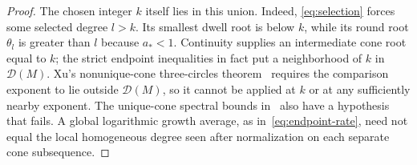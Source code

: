 \begin{proof}
The chosen integer $k$ itself lies in this union. Indeed,
\eqref{eq:selection} forces some selected degree $l>k$. Its smallest dwell
root is below $k$, while its round root $\theta_l$ is greater than $l$
because $a_*<1$. Continuity supplies an intermediate cone root equal to
$k$; the strict endpoint inequalities in fact put a neighborhood of $k$
in $\mathcal D(M)$. Xu's nonunique-cone three-circles
theorem~\cite[Theorem~3.4]{Xu} requires the comparison exponent to lie
outside $\mathcal D(M)$, so it cannot be applied at $k$ or at any
sufficiently nearby exponent. The unique-cone spectral bounds in~\cite{Huang} also
have a hypothesis that fails. A global logarithmic growth average, as
in~\eqref{eq:endpoint-rate}, need not equal the local homogeneous degree
seen after normalization on each separate cone subsequence.
\end{proof}
